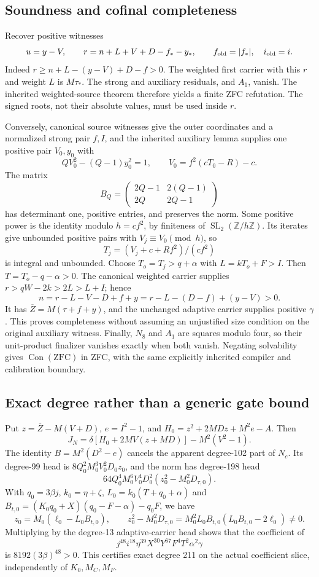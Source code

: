 \documentclass[11pt]{article}
\begin{document}
\subsection{Soundness and cofinal completeness}
Recover positive witnesses
\[
 u=y-V,\qquad
 r=n+L+V+D-f_*-y_*,\qquad f_{\rm old}=|f_*|,\quad i_{\rm old}=i.
\]
Indeed $r\ge n+L-(y-V)+D-f>0$.  The weighted first carrier with
this $r$ and weight $L$ is $M\tau_*$.  The strong and auxiliary residuals,
and $A_1$, vanish.  The inherited weighted-source theorem therefore yields
a finite ZFC refutation.  The signed roots, not their absolute values,
must be used inside $r$.

Conversely, canonical source witnesses give the outer coordinates and a
normalized strong pair $f,I$, and the inherited auxiliary lemma supplies
one positive pair $V_0,y_0$ with
\[
 QV_0^2-(Q-1)y_0^2=1,\qquad V_0=f^2(cT_0-R)-c.
\]
The matrix
\[
 B_Q=\begin{pmatrix}2Q-1&2(Q-1)\\2Q&2Q-1\end{pmatrix}
\]
has determinant one, positive entries, and preserves the norm.
Some positive power is the identity modulo $h=cf^2$, by finiteness of
$\operatorname{SL}_2(\mathbb Z/h\mathbb Z)$.  Its iterates give unbounded
positive pairs with $V_j\equiv V_0\pmod h$, so
\[
 T_j=(V_j+c+Rf^2)/(cf^2)
\]
is integral and unbounded.  Choose $T_o=T_j>q+\alpha$ with
$L=kT_o+F>I$.  Then $T=T_o-q-\alpha>0$.
The canonical weighted carrier supplies
$r>qW-2k>2L>L+I$; hence
\[
 n=r-L-V-D+f+y=r-L-(D-f)+(y-V)>0.
\]
It has $\overline Z=M(\tau+f+y)$, and the unchanged adaptive carrier
supplies positive $\gamma$.  This proves completeness without assuming
an unjustified size condition on the original auxiliary witness.
Finally, $N_8$ and $A_1$ are squares modulo four, so their unit-product
finalizer vanishes exactly when both vanish.  Negating solvability gives
$\operatorname{Con}(\mathrm{ZFC})$ in ZFC, with the same explicitly
inherited compiler and calibration boundary.

\subsection{Exact degree rather than a generic gate bound}
Put $z=\overline Z-M(V+D)$, $e=I^2-1$, and
$H_0=z^2+2MDz+M^2e-A$.  Then
\[
 J_N=\delta[H_0+2MV(z+MD)]-M^2(V^2-1).
\]
The identity $B=M^2(D^2-e)$ cancels the apparent degree-102 part of
$N_c$.  Its degree-99 head is $8Q_0^2M_0^3V_0^2D_0z_0$, and the
norm has degree-198 head
\[
 64Q_0^4M_0^6V_0^4D_0^2(z_0^2-M_0^2D_{\tau,0}).
\]
With $q_0=3\beta j$, $k_0=\eta+\zeta$,
$L_0=k_0(T+q_0+\alpha)$ and
$B_{t,0}=(K_0q_0+X)(q_0-F-\alpha)-q_0F$, we have
\[
 z_0=M_0(\ell_0-L_0B_{t,0}),\qquad
 z_0^2-M_0^2D_{\tau,0}
 =M_0^2L_0B_{t,0}(L_0B_{t,0}-2\ell_0)\ne0.
\]
Multiplying by the degree-13 adaptive-carrier head shows that the
coefficient of
\[
 j^{48}i^{18}\eta^{39}X^{30}Y^{67}F^4T^2\alpha^2\gamma
\]
is $8192(3\beta)^{48}>0$.  This certifies exact degree 211 on the
actual coefficient slice, independently of $K_0,M_C,M_F$.
\end{document}
